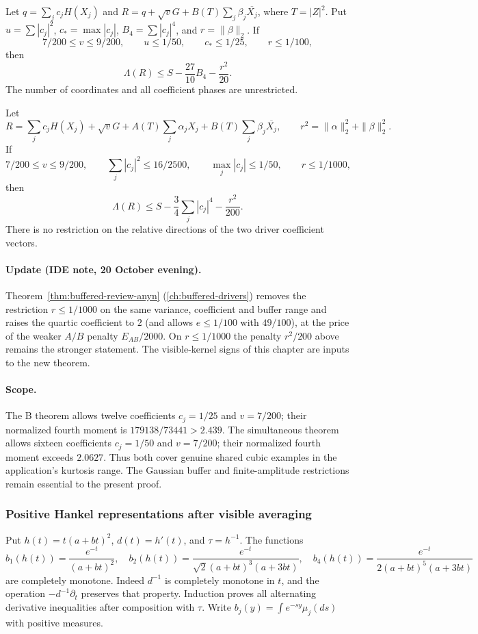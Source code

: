 \begin{theorem}
Let $q=\sum_jc_jH(X_j)$ and
$R=q+\sqrt vG+B(T)\sum_j\beta_j\overline{X_j}$, where
$T=|Z|^2$. Put $u=\sum|c_j|^2$, $c_*=\max|c_j|$,
$B_4=\sum|c_j|^4$, and $r=\|\beta\|_2$. If
\[
 7/200\le v\le9/200,\qquad u\le1/50,\qquad
 c_*\le1/25,\qquad r\le1/100,
\]
then
\[
 \Lambda(R)\le S-\frac{27}{10}B_4-\frac{r^2}{20}.
\]
The number of coordinates and all coefficient phases are unrestricted.
\end{theorem}

\begin{theorem}
Let
\[
 R=\sum_jc_jH(X_j)+\sqrt vG
   +A(T)\sum_j\alpha_jX_j+B(T)\sum_j\beta_j\overline{X_j},
 \qquad r^2=\|\alpha\|_2^2+\|\beta\|_2^2.
\]
If
\[
 7/200\le v\le9/200,\qquad
 \sum_j|c_j|^2\le16/2500,\qquad
 \max_j|c_j|\le1/50,\qquad r\le1/1000,
\]
then
\[
 \boxed{\Lambda(R)\le S-\frac34\sum_j|c_j|^4-\frac{r^2}{200}.}
\]
There is no restriction on the relative directions of the two driver
coefficient vectors.
\end{theorem}
\paragraph{Update (IDE note, 20 October evening).} Theorem~\ref{thm:buffered-review-anyn} (\autoref{ch:buffered-drivers}) removes the restriction
$r\le1/1000$ on the same variance, coefficient and buffer range and raises the quartic coefficient to $2$ (and allows $e\le1/100$ with $49/100$), at the price of the
weaker $A/B$ penalty $E_{AB}/2000$. On $r\le1/1000$ the penalty $r^2/200$ above remains the stronger statement. The visible-kernel signs of this chapter are inputs
to the new theorem.

\paragraph{Scope.}
The B theorem allows twelve coefficients $c_j=1/25$ and $v=7/200$;
their normalized fourth moment is $179138/73441>2.439$.
The simultaneous theorem allows sixteen coefficients $c_j=1/50$ and
$v=7/200$; their normalized fourth moment exceeds $2.0627$.
Thus both cover genuine shared cubic examples in the application's
kurtosis range. The Gaussian buffer and finite-amplitude restrictions
remain essential to the present proof.

\subsubsection{Positive Hankel representations after visible averaging}
Put $h(t)=t(a+bt)^2$, $d(t)=h'(t)$, and $\tau=h^{-1}$.
The functions
\[
 b_1(h(t))=\frac{e^{-t}}{(a+bt)^2},\quad
 b_2(h(t))=\frac{e^{-t}}{\sqrt2(a+bt)^3(a+3bt)},\quad
 b_4(h(t))=\frac{e^{-t}}{2(a+bt)^5(a+3bt)}
\]
are completely monotone. Indeed $d^{-1}$ is completely monotone in
$t$, and the operation $-d^{-1}\partial_t$ preserves that property.
Induction proves all alternating derivative inequalities after
composition with $\tau$. Write $b_j(y)=\int e^{-sy}\mu_j(ds)$ with
positive measures.

